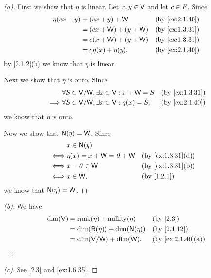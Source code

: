 \begin{proof}[(a)]
  First we show that \(\eta\) is linear.
  Let \(x, y \in \mathsf{V}\) and let \(c \in \mathit{F}\).
  Since
  \begin{align*}
    \eta(cx + y) & = (cx + y) + \W         &  & \by{ex:2.1.40} \\
                 & = (cx + \W) + (y + \W)  &  & \by{ex:1.3.31} \\
                 & = c (x + \W) + (y + \W) &  & \by{ex:1.3.31} \\
                 & = c \eta(x) + \eta(y),  &  & \by{ex:2.1.40}
  \end{align*}
  by \cref{2.1.2}(b) we know that \(\eta\) is linear.

  Next we show that \(\eta\) is onto.
  Since
  \begin{align*}
             & \forall S \in \V / \W, \exists x \in \V : x + \W = S   &  & \by{ex:1.3.31} \\
    \implies & \forall S \in \V / \W, \exists x \in \V : \eta(x) = S, &  & \by{ex:2.1.40}
  \end{align*}
  we know that \(\eta\) is onto.

  Now we show that \(\ns{\eta} = \W\).
  Since
  \begin{align*}
         & x \in \ns{\eta}                                    \\
    \iff & \eta(x) = x + \W = \zv + \W &  & \by{ex:1.3.31}[d] \\
    \iff & x - \zv \in \W              &  & \by{ex:1.3.31}[b] \\
    \iff & x \in \W,                   &  & \by{1.2.1}
  \end{align*}
  we know that \(\ns{\eta} = \W\).
\end{proof}

\begin{proof}[(b)]
  We have
  \begin{align*}
    \dim(\V) & = \rk{\eta} + \nt{\eta}             &  & \by{2.3}          \\
             & = \dim(\rg{\eta}) + \dim(\ns{\eta}) &  & \by{2.1.12}       \\
             & = \dim(\V / \W) + \dim(\W).         &  & \by{ex:2.1.40}[a]
  \end{align*}
\end{proof}

\begin{proof}[(c)]
  See \cref{2.3} and \cref{ex:1.6.35}.
\end{proof}
